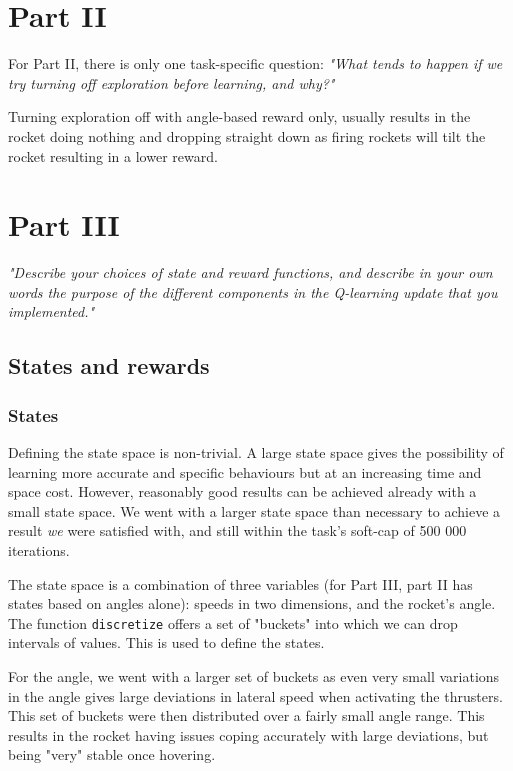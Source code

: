 
\section{Part II}

For Part II, there is only one task-specific question: \emph{"What tends to happen if we try turning off exploration before learning, and why?"}

Turning exploration off with angle-based reward only, usually results in the rocket doing nothing and dropping straight down as firing rockets will tilt the rocket resulting in a lower reward.

\section{Part III}
\emph{"Describe your choices of state and reward functions, and describe in your own words the purpose of the different components in the Q-learning update that you implemented."}

\subsection{States and rewards}
\subsubsection{States}
Defining the state space is non-trivial. A large state space gives the possibility of learning more accurate and specific behaviours but at an increasing time and space cost. However, reasonably good results can be achieved already with a small state space. We went with a larger state space than necessary to achieve a result \emph{we} were satisfied with, and still within the task's soft-cap of 500 000 iterations.

The state space is a combination of three variables (for Part III, part II has states based on angles alone): speeds in two dimensions, and the rocket's angle. The function \verb=discretize= offers a set of "buckets" into which we can drop intervals of values. This is used to define the states.

For the angle, we went with a larger set of buckets as even very small variations in the angle gives large deviations in lateral speed when activating the thrusters. This set of buckets were then distributed over a fairly small angle range. This results in the rocket having issues coping accurately with large deviations, but being "very" stable once hovering.

